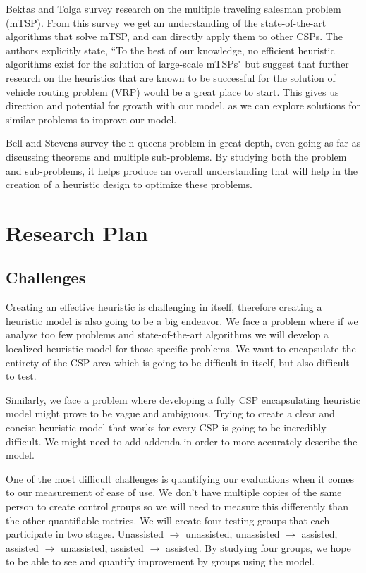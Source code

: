 \documentclass[10pt,twoside]{IEEEtran}
\begin{document}
Bektas and Tolga \cite{bektas2006multiple} survey research on the multiple traveling salesman problem (mTSP). From this survey we get an understanding of the state-of-the-art algorithms that solve mTSP, and can directly apply them to other CSPs. The authors explicitly state, ``To the best of our knowledge, no efficient heuristic algorithms exist for the solution of large-scale mTSPs" but suggest that further research on the heuristics that are known to be successful for the solution of vehicle routing problem (VRP) would be a great place to start. This gives us direction and potential for growth with our model, as we can explore solutions for similar problems to improve our model.

Bell and Stevens \cite{bell2009survey} survey the n-queens problem in great depth, even going as far as discussing theorems and multiple sub-problems. By studying both the problem and sub-problems, it helps produce an overall understanding that will help in the creation of a heuristic design to optimize these problems.


\section{Research Plan}
\subsection{Challenges}
Creating an effective heuristic is challenging in itself, therefore creating a heuristic model is also going to be a big endeavor. We face a problem where if we analyze too few problems and state-of-the-art algorithms we will develop a localized heuristic model for those specific problems. We want to encapsulate the entirety of the CSP area which is going to be difficult in itself, but also difficult to test. 

Similarly, we face a problem where developing a fully CSP encapsulating heuristic model might prove to be vague and ambiguous. Trying to create a clear and concise heuristic model that works for every CSP is going to be incredibly difficult. We might need to add addenda in order to more accurately describe the model.

One of the most difficult challenges is quantifying our evaluations when it comes to our measurement of ease of use. We don't have multiple copies of the same person to create control groups so we will need to measure this differently than the other quantifiable metrics. We will create four testing groups that each participate in two stages. Unassisted $\rightarrow$ unassisted, unassisted $\rightarrow$ assisted, assisted $\rightarrow$ unassisted, assisted $\rightarrow$ assisted. By studying four groups, we hope to be able to see and quantify improvement by groups using the model.
\end{document}
